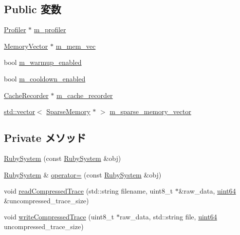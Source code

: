 \subsection*{Public 変数}
\begin{DoxyCompactItemize}
\item 
\hyperlink{classProfiler}{Profiler} $\ast$ \hyperlink{classRubySystem_ad0e39538c0dbbe770d4c19025103b39a}{m\_\-profiler}
\item 
\hyperlink{classMemoryVector}{MemoryVector} $\ast$ \hyperlink{classRubySystem_a107b799e6f2f820a02d25dc1ba6f7014}{m\_\-mem\_\-vec}
\item 
bool \hyperlink{classRubySystem_ae9051ba7e9770f4a2be7a20f6f185e86}{m\_\-warmup\_\-enabled}
\item 
bool \hyperlink{classRubySystem_a89b41c4f399369eb42a580d0c32a7c0b}{m\_\-cooldown\_\-enabled}
\item 
\hyperlink{classCacheRecorder}{CacheRecorder} $\ast$ \hyperlink{classRubySystem_a12cc73bd44b03600f54d4ca386f7bc20}{m\_\-cache\_\-recorder}
\item 
\hyperlink{classstd_1_1vector}{std::vector}$<$ \hyperlink{classSparseMemory}{SparseMemory} $\ast$ $>$ \hyperlink{classRubySystem_a808eab8032db5c7032a0b805fbb77351}{m\_\-sparse\_\-memory\_\-vector}
\end{DoxyCompactItemize}
\subsection*{Private メソッド}
\begin{DoxyCompactItemize}
\item 
\hyperlink{classRubySystem_a273c873452012ea56ae230db703d5c53}{RubySystem} (const \hyperlink{classRubySystem}{RubySystem} \&obj)
\item 
\hyperlink{classRubySystem}{RubySystem} \& \hyperlink{classRubySystem_a58b52a9b6b16a43dede7354145249435}{operator=} (const \hyperlink{classRubySystem}{RubySystem} \&obj)
\item 
void \hyperlink{classRubySystem_a94173d52d87090e6088f923496535c1d}{readCompressedTrace} (std::string filename, uint8\_\-t $\ast$\&raw\_\-data, \hyperlink{TypeDefines_8hh_a29940ae63ec06c9998bba873e25407ad}{uint64} \&uncompressed\_\-trace\_\-size)
\item 
void \hyperlink{classRubySystem_a158f1a4484dab34bceeee8cb54501ced}{writeCompressedTrace} (uint8\_\-t $\ast$raw\_\-data, std::string file, \hyperlink{TypeDefines_8hh_a29940ae63ec06c9998bba873e25407ad}{uint64} uncompressed\_\-trace\_\-size)
\end{DoxyCompactItemize}
